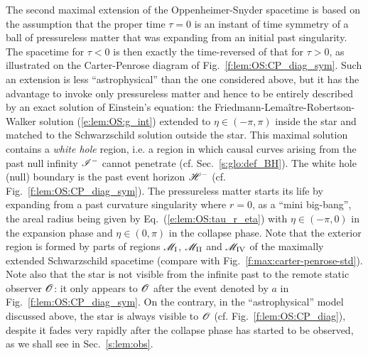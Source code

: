 The second maximal extension of the Oppenheimer-Snyder spacetime
is based on the assumption that the proper time $\tau=0$ is an instant of
time symmetry of a ball of pressureless matter that was expanding from an
initial past singularity. The spacetime for $\tau < 0$ is then exactly the
time-reversed of that for $\tau > 0$, as illustrated on the Carter-Penrose
diagram of Fig.~\ref{f:lem:OS:CP_diag_sym}.
Such an extension is less ``astrophysical'' than the one considered above, but
it has the advantage to invoke only pressureless matter
and hence to be entirely described by an exact solution of Einstein's equation:
the Friedmann-Lemaître-Robertson-Walker solution (\ref{e:lem:OS:g_int})
extended to $\eta \in (-\pi, \pi)$
inside the star and matched to the Schwarzschild solution
outside the star. This maximal solution contains a \emph{white hole} region,
i.e. a region in which causal curves arising from the
past null infinity $\mathscr{I}^-$ cannot penetrate (cf. Sec.~\ref{s:glo:def_BH}).
The white hole (null) boundary is the past event horizon $\mathscr{H}^-$ (cf. Fig.~\ref{f:lem:OS:CP_diag_sym}).
The pressureless matter starts its life by expanding from a past curvature singularity where $r=0$,
as a ``mini big-bang'',
the areal radius being given by Eq.~(\ref{e:lem:OS:tau_r_eta}) with $\eta\in (-\pi,0)$
in the expansion phase and $\eta \in (0, \pi)$ in the collapse phase.
Note that the exterior region is formed by parts of regions $\mathscr{M}_{\rm I}$,
$\mathscr{M}_{\rm II}$ and $\mathscr{M}_{\rm IV}$ of the maximally extended
Schwarzschild spacetime (compare with Fig.~\ref{f:max:carter-penrose-std}).
Note also that the star is not visible from the infinite past to the remote static observer
$\mathscr{O}$: it only appears to $\mathscr{O}$
after the event denoted by $a$ in Fig.~\ref{f:lem:OS:CP_diag_sym}.
On the contrary, in the ``astrophysical'' model discussed above,
the star is always visible to $\mathscr{O}$ (cf. Fig.~\ref{f:lem:OS:CP_diag}),
despite it fades very rapidly after the collapse phase has started to be observed,
as we shall see in Sec.~\ref{s:lem:obs}.

